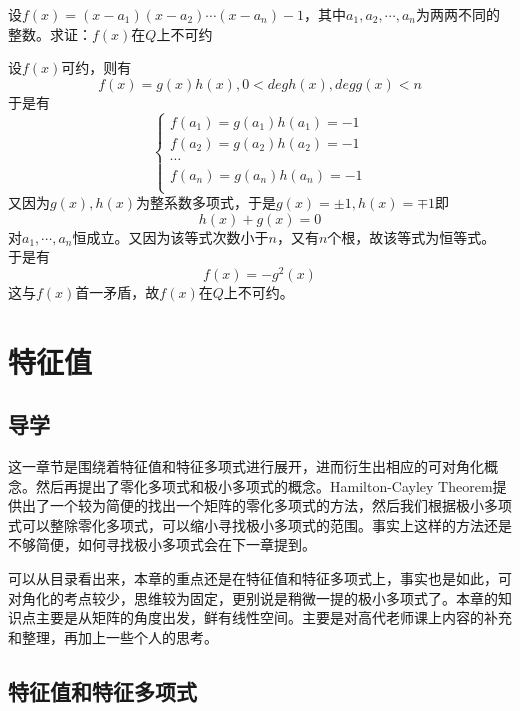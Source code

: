 \documentclass[lang=cn,10pt]{elegantbook}
\begin{document}
\begin{example}
	设$f(x)=(x-a_1)(x-a_2)\cdots(x-a_n)-1$，其中$a_1,a_2,\cdots,a_n$为两两不同的整数。求证：$f(x)$在$Q$上不可约
\end{example}
\begin{solution}
	
	设$f(x)$可约，则有
	\begin{equation*}
		f(x)=g(x)h(x),0<degh(x),degg(x)<n
	\end{equation*}
	于是有
	\begin{equation*}
		\begin{cases}
			f(a_1)=g(a_1)h(a_1)=-1\\
			f(a_2)=g(a_2)h(a_2)=-1\\
			\cdots\\
			f(a_n)=g(a_n)h(a_n)=-1\\
		\end{cases}
	\end{equation*}
	又因为$g(x),h(x)$为整系数多项式，于是$g(x)=\pm1,h(x)=\mp1$即
	\begin{equation*}
		h(x)+g(x)=0
	\end{equation*}
	对$a_{1},\cdots,a_{n}$恒成立。又因为该等式次数小于$n$，又有$n$个根，故该等式为恒等式。
	于是有
	\begin{equation*}
		f(x)=-g^{2}(x)
	\end{equation*}
	这与$f(x)$首一矛盾，故$f(x)$在$Q$上不可约。
\end{solution}
\chapter{特征值}
\section{导学}

这一章节是围绕着特征值和特征多项式进行展开，进而衍生出相应的可对角化概念。然后再提出了零化多项式和极小多项式的概念。Hamilton-Cayley Theorem提供出了一个较为简便的找出一个矩阵的零化多项式的方法，然后我们根据极小多项式可以整除零化多项式，可以缩小寻找极小多项式的范围。事实上这样的方法还是不够简便，如何寻找极小多项式会在下一章提到。

可以从目录看出来，本章的重点还是在特征值和特征多项式上，事实也是如此，可对角化的考点较少，思维较为固定，更别说是稍微一提的极小多项式了。本章的知识点主要是从矩阵的角度出发，鲜有线性空间。主要是对高代老师课上内容的补充和整理，再加上一些个人的思考。
\section{特征值和特征多项式}
\end{document}
